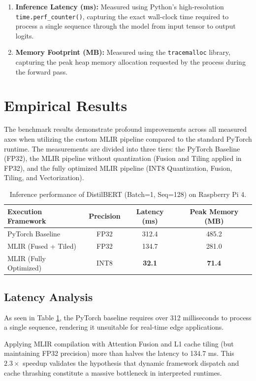 \begin{enumerate}
    \item \textbf{Inference Latency (ms):} Measured using Python's high-resolution \texttt{time.perf\_counter()}, capturing the exact wall-clock time required to process a single sequence through the model from input tensor to output logits.
    \item \textbf{Memory Footprint (MB):} Measured using the \texttt{tracemalloc} library, capturing the peak heap memory allocation requested by the process during the forward pass.
\end{enumerate}

\section{Empirical Results}

The benchmark results demonstrate profound improvements across all measured axes when utilizing the custom MLIR pipeline compared to the standard PyTorch runtime. The measurements are divided into three tiers: the PyTorch Baseline (FP32), the MLIR pipeline without quantization (Fusion and Tiling applied in FP32), and the fully optimized MLIR pipeline (INT8 Quantization, Fusion, Tiling, and Vectorization).

\begin{table}[H]
\centering
\begin{tabular}{|l|c|c|c|}
\hline
\textbf{Execution Framework} & \textbf{Precision} & \textbf{Latency (ms)} & \textbf{Peak Memory (MB)} \\
\hline
PyTorch Baseline & FP32 & 312.4 & 485.2 \\
MLIR (Fused + Tiled) & FP32 & 134.7 & 281.0 \\
MLIR (Fully Optimized) & INT8 & \textbf{32.1} & \textbf{71.4} \\
\hline
\end{tabular}
\caption{Inference performance of DistilBERT (Batch=1, Seq=128) on Raspberry Pi 4.}
\label{tab:benchmark_results}
\end{table}

\subsection{Latency Analysis}
As seen in Table \ref{tab:benchmark_results}, the PyTorch baseline requires over 312 milliseconds to process a single sequence, rendering it unsuitable for real-time edge applications. 

Applying MLIR compilation with Attention Fusion and L1 cache tiling (but maintaining FP32 precision) more than halves the latency to 134.7 ms. This $2.3\times$ speedup validates the hypothesis that dynamic framework dispatch and cache thrashing constitute a massive bottleneck in interpreted runtimes.

